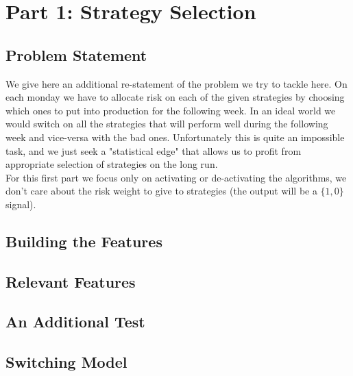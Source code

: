 \documentclass[12pt]{article} %
\numberwithin{equation}{subsection}
\begin{document}





\section{Part 1: Strategy Selection}

\subsection{Problem Statement}

We give here an additional re-statement of the problem we try to tackle here. On each monday we have to allocate risk on each of the given strategies by choosing which ones to put into production for the following week. In an ideal world we would switch on all the strategies that will perform well during the following week and vice-versa with the bad ones. Unfortunately this is quite an impossible task, and we just seek a "statistical edge" that allows us to profit from appropriate selection of strategies on the long run.\\
For this first part we focus only on activating or de-activating the algorithms, we don't care about the risk weight to give to strategies (the output will be a $\{1,0\}$ signal).

\subsection{Building the Features}




\subsection{Relevant Features}




\subsection{An Additional Test}



\subsection{Switching Model}
\end{document}
